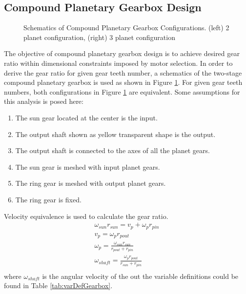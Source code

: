 \subsection{\textbf{Compound Planetary Gearbox Design}}
\label{sec:compoundGearBox}

\begin{figure}
	\centering
	\caption{Schematics of Compound Planetary Gearbox Configurations. (left) 2 planet configuration, (right) 3 planet configuration}
	\label{fig:planetaryGearbox}
\end{figure}

The objective of compound planetary gearbox design is to achieve desired gear ratio within dimensional constraints imposed by motor selection. In order to derive the gear ratio for given gear teeth number, a schematics of the two-stage compound planetary gearbox is used as shown in Figure \ref{fig:planetaryGearbox}. For given gear teeth numbers, both configurations in Figure \ref{fig:planetaryGearbox} are equivalent. Some assumptions for this analysis is posed here: 

\begin{enumerate}
	\item The sun gear located at the center is the input.
	\item The output shaft shown as yellow transparent shape is the output.
	\item The output shaft is connected to the axes of all the planet gears.
	\item The sun gear is meshed with input planet gears.
	\item The ring gear is meshed with output planet gears.
	\item The ring gear is fixed.
\end{enumerate}

Velocity equivalence is used to calculate the gear ratio.
\begin{eqnarray}
\omega_{sun} r_{sun} = v_p + \omega_p r_{pin}\\
v_p = \omega_{p} r_{pout}\\
\omega_p = \frac{\omega_{sun}r_{sun}}{r_{pout}+r_{pin}}\\
\omega_{shaft} = \frac{\omega_{p}r_{pout}}{r_{sun}+r_{pin}}\\

\end{eqnarray}
where $\omega_{shaft}$ is the angular velocity of the out
 the variable definitions could be found in Table \ref{tab:varDefGearbox}.


